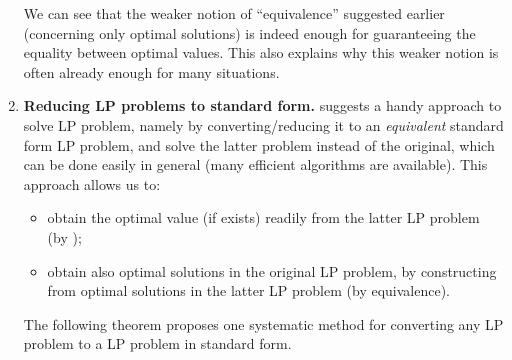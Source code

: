 \begin{enumerate}
\begin{pf}
\end{pf}

\begin{note}
We can see that the weaker notion of ``equivalence'' suggested earlier
(concerning only optimal solutions) is indeed enough for guaranteeing the
equality between optimal values.  This also explains why this weaker notion is
often already enough for many situations.
\end{note}
\item \textbf{Reducing LP problems to standard form.}
 suggests a handy approach to solve LP problem,
namely by converting/reducing it to an \emph{equivalent} standard form LP
problem, and solve the latter problem instead of the original, which can be
done easily in general (many efficient algorithms are available). This approach
allows us to:
\begin{itemize}
\item obtain the optimal value (if exists) readily from the latter LP problem
(by );
\item obtain also optimal solutions in the original LP problem, by constructing
from optimal solutions in the latter LP problem (by equivalence).
\end{itemize}

\begin{center}
\end{center}
The following theorem proposes one systematic method for converting any LP
problem to a LP problem in standard form.


\end{enumerate}
